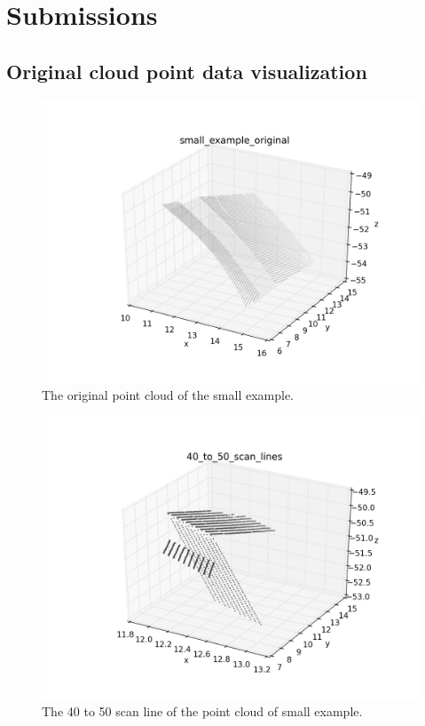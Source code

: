 \documentclass[a4paper,12pt]{article}
\begin{document}
\section{Submissions}
\subsection{Original cloud point data visualization}
\begin{figure}[H]
  \begin{center}
      \includegraphics[scale=0.65]{small_example_original.png}
\end{center}
\caption{The original point cloud of the small example.}
 \label{fig:sml_origin}
 \end{figure}
 
  \begin{figure}[H]
  \begin{center}
      \includegraphics[scale=0.65]{40_to_50_scan_lines.png}
\end{center}
\caption{The 40 to 50 scan line of the point cloud of small example.}
 \label{fig:40_50_sml_origin}
 \end{figure}
\end{document}
